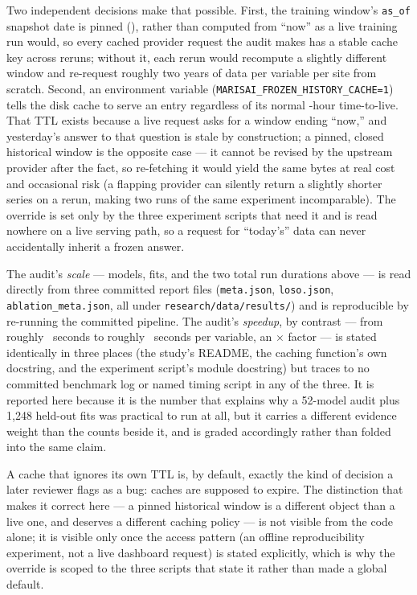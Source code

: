  Two independent decisions make that possible. First,
the training window's \texttt{as\_of} snapshot date is pinned
(\PinnedAsOfDate{}), rather than computed from ``now'' as a live training run
would, so every cached provider request the audit makes has a stable cache
key across reruns; without it, each rerun would recompute a slightly
different window and re-request roughly two years of data per variable per
site from scratch. Second, an environment variable
(\texttt{MARISAI\_FROZEN\_HISTORY\_CACHE=1}) tells the disk cache to serve an
entry regardless of its normal \DiskCacheTtlHours{}-hour time-to-live. That
TTL exists because a live request asks for a window ending ``now,'' and
yesterday's answer to that question is stale by construction; a pinned,
closed historical window is the opposite case --- it cannot be revised by
the upstream provider after the fact, so re-fetching it would yield the same
bytes at real cost and occasional risk (a flapping provider can silently
return a slightly shorter series on a rerun, making two runs of the same
experiment incomparable). The override is set only by the three experiment
scripts that need it and is read nowhere on a live serving path, so a
request for ``today's'' data can never accidentally inherit a frozen answer.

 The audit's \emph{scale} ---
\NModelsAudited{} models, \NHeldoutFits{} fits, and the two total run
durations above --- is read directly from three committed report files
(\texttt{meta.json}, \texttt{loso.json}, \texttt{ablation\_meta.json}, all
under \texttt{research/data/results/}) and is reproducible by re-running the
committed pipeline. The audit's \emph{speedup}, by contrast --- from roughly
\AuditSecondsUncached{}~seconds to roughly \AuditSecondsCached{}~seconds per
variable, an \AuditSpeedupFactor{}$\times$ factor --- is stated identically
in three places (the study's README, the caching function's own docstring,
and the experiment script's module docstring) but traces to no committed
benchmark log or named timing script in any of the three. It is reported
here because it is the number that explains why a 52-model audit plus 1,248
held-out fits was practical to run at all, but it carries a different
evidence weight than the counts beside it, and is graded accordingly rather
than folded into the same claim.

 A cache that ignores its own TTL is, by default,
exactly the kind of decision a later reviewer flags as a bug: caches are
supposed to expire. The distinction that makes it correct here --- a pinned
historical window is a different object than a live one, and deserves a
different caching policy --- is not visible from the code alone; it is
visible only once the access pattern (an offline reproducibility experiment,
not a live dashboard request) is stated explicitly, which is why the
override is scoped to the three scripts that state it rather than made a
global default.


